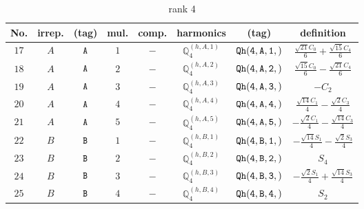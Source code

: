 \documentclass[fleqn,8pt]{jsarticle}
\begin{document}
\begin{table}[ht!]
\begin{center}
\caption{rank 4}
\renewcommand{\arraystretch}{1.3}
\begin{tabular}{cccccccc} \hline \hline
No. & irrep. & (tag) & mul. & comp. & harmonics & (tag) & definition \\ \hline
$ 17 $ & $ A $ & $ {\tt A} $ & $ 1 $ & $ - $ & $ \mathbb{Q}_{4}^{(h,A,1)} $ & $ {\tt Qh(4,A,1,)} $ & $ \frac{\sqrt{21} C_{0}}{6} + \frac{\sqrt{15} C_{4}}{6} $ \\
$ 18 $ & $ A $ & $ {\tt A} $ & $ 2 $ & $ - $ & $ \mathbb{Q}_{4}^{(h,A,2)} $ & $ {\tt Qh(4,A,2,)} $ & $ \frac{\sqrt{15} C_{0}}{6} - \frac{\sqrt{21} C_{4}}{6} $ \\
$ 19 $ & $ A $ & $ {\tt A} $ & $ 3 $ & $ - $ & $ \mathbb{Q}_{4}^{(h,A,3)} $ & $ {\tt Qh(4,A,3,)} $ & $ - C_{2} $ \\
$ 20 $ & $ A $ & $ {\tt A} $ & $ 4 $ & $ - $ & $ \mathbb{Q}_{4}^{(h,A,4)} $ & $ {\tt Qh(4,A,4,)} $ & $ \frac{\sqrt{14} C_{1}}{4} - \frac{\sqrt{2} C_{3}}{4} $ \\
$ 21 $ & $ A $ & $ {\tt A} $ & $ 5 $ & $ - $ & $ \mathbb{Q}_{4}^{(h,A,5)} $ & $ {\tt Qh(4,A,5,)} $ & $ - \frac{\sqrt{2} C_{1}}{4} - \frac{\sqrt{14} C_{3}}{4} $ \\
$ 22 $ & $ B $ & $ {\tt B} $ & $ 1 $ & $ - $ & $ \mathbb{Q}_{4}^{(h,B,1)} $ & $ {\tt Qh(4,B,1,)} $ & $ - \frac{\sqrt{14} S_{1}}{4} - \frac{\sqrt{2} S_{3}}{4} $ \\
$ 23 $ & $ B $ & $ {\tt B} $ & $ 2 $ & $ - $ & $ \mathbb{Q}_{4}^{(h,B,2)} $ & $ {\tt Qh(4,B,2,)} $ & $ S_{4} $ \\
$ 24 $ & $ B $ & $ {\tt B} $ & $ 3 $ & $ - $ & $ \mathbb{Q}_{4}^{(h,B,3)} $ & $ {\tt Qh(4,B,3,)} $ & $ - \frac{\sqrt{2} S_{1}}{4} + \frac{\sqrt{14} S_{3}}{4} $ \\
$ 25 $ & $ B $ & $ {\tt B} $ & $ 4 $ & $ - $ & $ \mathbb{Q}_{4}^{(h,B,4)} $ & $ {\tt Qh(4,B,4,)} $ & $ S_{2} $ \\
 \hline \hline
\end{tabular}
\end{center}
\end{table}
\end{document}

